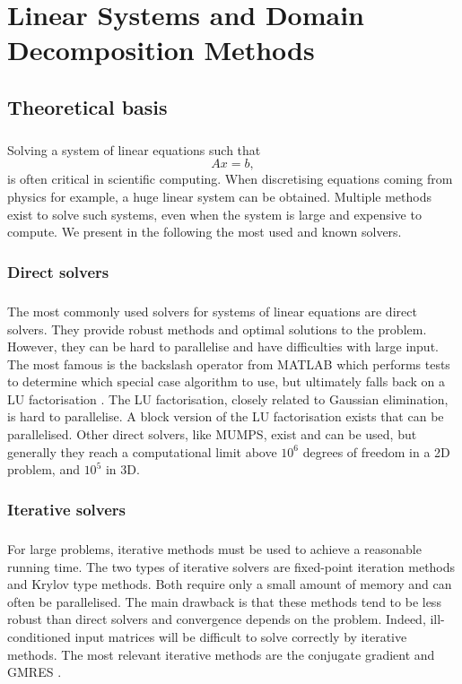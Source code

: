 \chapter{Linear Systems and Domain Decomposition Methods}

\section{Theoretical basis}

\paragraph{}
Solving a system of linear equations such that
\[Ax = b,\]
is often critical in scientific computing.
When discretising equations coming from physics for example, a huge linear system can be obtained.
Multiple methods exist to solve such systems, even when the system is large and expensive to compute.
We present in the following the most used and known solvers.

\subsection{Direct solvers}

\paragraph{}
The most commonly used solvers for systems of linear equations are direct solvers.
They provide robust methods and optimal solutions to the problem.
However, they can be hard to parallelise and have difficulties with large input.
The most famous is the backslash operator from MATLAB which performs tests to determine which special case algorithm to use, but ultimately falls back on a LU factorisation \cite{mldivide_matlab}.
The LU factorisation, closely related to Gaussian elimination, is hard to parallelise.
A block version of the LU factorisation exists that can be parallelised.
Other direct solvers, like MUMPS, exist and can be used, but generally they reach a computational limit above \(10^6\) degrees of freedom in a 2D problem, and \(10^5\) in 3D.

\subsection{Iterative solvers}

\paragraph{}
For large problems, iterative methods must be used to achieve a reasonable running time.
The two types of iterative solvers are fixed-point iteration methods and Krylov type methods.
Both require only a small amount of memory and can often be parallelised.
The main drawback is that these methods tend to be less robust than direct solvers and convergence depends on the problem.
Indeed, ill-conditioned input matrices will be difficult to solve correctly by iterative methods.
The most relevant iterative methods are the conjugate gradient and GMRES \cite{saad_gmres_1986}.

